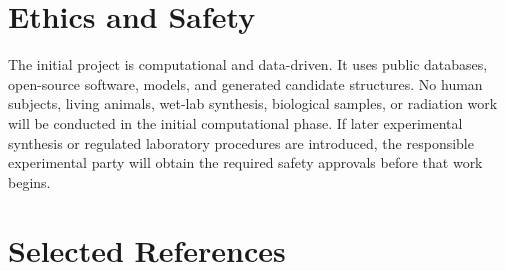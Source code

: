 \documentclass[10pt,a4paper]{article}
\begin{document}
\section{Ethics and Safety}
The initial project is computational and data-driven. It uses public databases, open-source software, models, and generated candidate structures. No human subjects, living animals, wet-lab synthesis, biological samples, or radiation work will be conducted in the initial computational phase. If later experimental synthesis or regulated laboratory procedures are introduced, the responsible experimental party will obtain the required safety approvals before that work begins.

\section{Selected References}
\small
\end{document}
